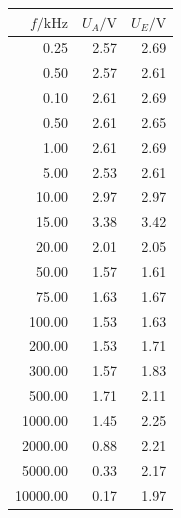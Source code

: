 \documentclass[]{scrartcl}
\begin{document}
\begin{table}[H]
	\centering
	\label{tab:ggverst_b}
	\hskip-1.50cm
	\begin{tabular}{r r r}
		\toprule
		$f / \si{\kilo\hertz}$ & $U_A/\si{\volt}$ & $U_E/\si{\volt}$ \\
		\midrule
		0.25	&	2.57	&	2.69 \\
		0.50	&	2.57	&	2.61 \\
		0.10	&	2.61	&	2.69 \\
		0.50	&	2.61	&	2.65 \\
		1.00	&	2.61	&	2.69 \\
		5.00	&	2.53	&	2.61 \\
		10.00	&	2.97	&	2.97 \\
		15.00	&	3.38	&	3.42 \\
		20.00	&	2.01	&	2.05 \\
		50.00	&	1.57	&	1.61 \\
		75.00	&	1.63	&	1.67 \\
		100.00	&	1.53	&	1.63 \\
		200.00	&	1.53	&	1.71 \\
		300.00	&	1.57	&	1.83 \\
		500.00	&	1.71	&	2.11 \\
		1000.00	&	1.45	&	2.25 \\
		2000.00	&	0.88	&	2.21 \\
		5000.00	&	0.33	&	2.17 \\
		10000.00	&	0.17	&	1.97 \\
		\bottomrule
	\end{tabular}
\end{table}
\end{document}
